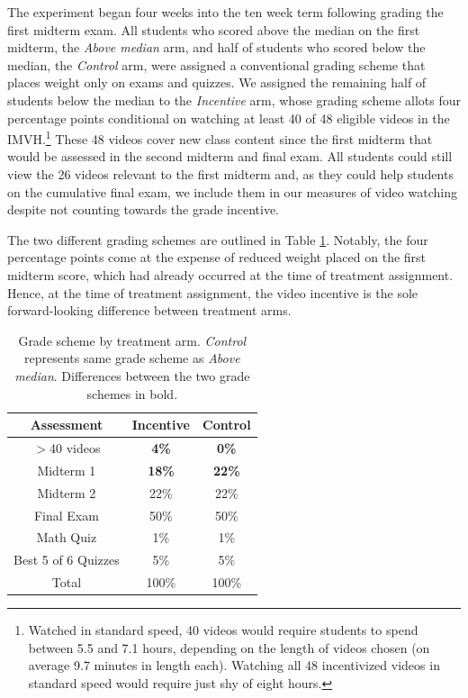 \documentclass[12pt]{article}
\begin{document}
The experiment began four weeks into the ten week term following grading the first midterm exam. All students who scored above the median on the first midterm, the \textit{Above median} arm, and half of students who scored below the median, the \textit{Control} arm, were assigned a conventional grading scheme that places weight only on exams and quizzes. We assigned the remaining half of students below the median to the \textit{Incentive} arm, whose grading scheme allots four percentage points conditional on watching at least 40 of 48 eligible videos in the IMVH.\footnote{Watched in standard speed, 40 videos would require students to spend between 5.5 and 7.1 hours, depending on the length of videos chosen (on average 9.7 minutes in length each). Watching all 48 incentivized videos in standard speed would require just shy of eight hours.} These 48 videos cover new class content since the first midterm that would be assessed in the second midterm and final exam. All students could still view the 26 videos relevant to the first midterm and, as they could help students on the cumulative final exam, we include them in our measures of video watching despite not counting towards the grade incentive.

The two different grading schemes are outlined in Table \ref{gradescheme}. Notably, the four percentage points come at the expense of reduced weight placed on the first midterm score, which had already occurred at the time of treatment assignment. Hence, at the time of treatment assignment, the video incentive is the sole forward-looking difference between treatment arms.

\begin{table}
	\caption{Grade scheme by treatment arm. \textit{Control} represents same grade scheme as \textit{Above median}. Differences between the two grade schemes in bold.}
	\centering
	\begin{tabular}{ c|c|c }
		Assessment & Incentive & Control \\
		\hline
		$>$40 videos & \textbf{4\%} & \textbf{0\%} \\
		Midterm 1 & \textbf{18\%} & \textbf{22\%} \\
		Midterm 2 & 22\% & 22\% \\
		Final Exam & 50\% & 50\% \\
		Math Quiz & 1\% & 1\% \\
		Best 5 of 6 Quizzes & 5\% & 5\% \\
		\hline
		Total & 100\% & 100\% \\
	\end{tabular}
	\label{gradescheme}
\end{table}
\end{document}
